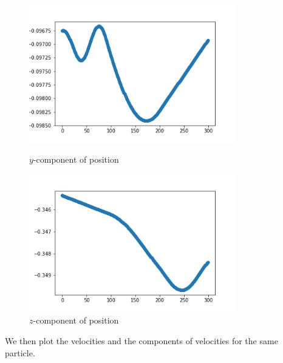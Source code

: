 \documentclass[12pt]{article}
\begin{document}
	\begin{figure}[H]
		\begin{multicols}{2}
			\includegraphics[width=\linewidth, height=6cm]{psy3.png} \caption{$y$-component of position} \label{psy3} \par
			\includegraphics[width=\linewidth, height=6cm]{psz3.png} \caption{$z$-component of position} \label{psz3} \par
		\end{multicols}
	\end{figure}
	\noindent We then plot the velocities and the components of velocities for the same particle.
\end{document}
